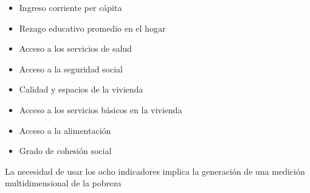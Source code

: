 \begin{itemize}
    \item Ingreso corriente per cápita
    \item Rezago educativo promedio en el hogar
    \item Acceso a los servicios de salud
    \item Acceso a la seguridad social
    \item Calidad y espacios de la vivienda
    \item Acceso a los servicios básicos en la vivienda
    \item Acceso a la alimentación
    \item Grado de cohesión social
\end{itemize}
La necesidad de usar los ocho indicadores implica la generación de una medición multidimensional de la pobreza
